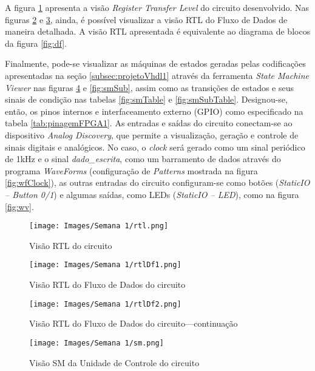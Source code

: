 \documentclass[amsmath,amssymb,floatfix]{report}
\begin{document}
A figura \ref{fig:rtl} apresenta a visão \textit{Register Transfer Level} do circuito desenvolvido. Nas figuras \ref{fig:rtlDf1} e \ref{fig:rtlDf2}, ainda, é possível visualizar a visão RTL do Fluxo de Dados de maneira detalhada. A visão RTL apresentada é equivalente ao diagrama de blocos da figura \ref{fig:df}. 

Finalmente, pode-se visualizar as máquinas de estados geradas pelas codificações apresentadas na seção \ref{subsec:projetoVhdl1} através da ferramenta \textit{State Machine Viewer} nas figuras \ref{fig:sm} e \ref{fig:smSub}, assim como as transições de estados e seus sinais de condição nas tabelas \ref{fig:smTable} e \ref{fig:smSubTable}. Designou-se, então, os pinos internos e interfaceamento externo (GPIO) como especificado na tabela \ref{tab:pinagemFPGA1}. As entradas e saídas do circuito conectam-se ao dispositivo \textit{Analog Discovery}, que permite a visualização, geração e controle de sinais digitais e analógicos. No caso, o \textit{clock} será gerado como um sinal periódico de 1kHz  e o sinal \textit{dado\_escrita}, como um barramento de dados através do programa \textit{WaveForms} (configuração de \textit{Patterns} mostrada na figura \ref{fig:wfClock}), as outras entradas do circuito configuram-se como botões (\textit{StaticIO -- Button 0/1}) e algumas saídas, como LEDs (\textit{StaticIO -- LED}), como na figura \ref{fig:wv}.

\begin{figure}[H]
\centering
\texttt{[image: Images/Semana 1/rtl.png]} 
    \caption{Visão RTL do circuito}
    \label{fig:rtl}
\end{figure} 

\begin{figure}[H]
\centering
\texttt{[image: Images/Semana 1/rtlDf1.png]} 
    \caption{Visão RTL do Fluxo de Dados do circuito}
    \label{fig:rtlDf1}
\end{figure} 

\begin{figure}[H]
\centering
\texttt{[image: Images/Semana 1/rtlDf2.png]} 
    \caption{Visão RTL do Fluxo de Dados do circuito---continuação}
    \label{fig:rtlDf2}
\end{figure} 

\begin{figure}[H]
\centering
\texttt{[image: Images/Semana 1/sm.png]} 
    \caption{Visão SM da Unidade de Controle do circuito}
    \label{fig:sm}
\end{figure} 
\end{document}
